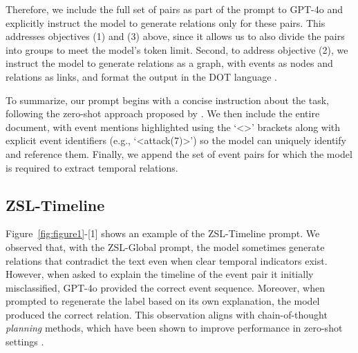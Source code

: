 Therefore, we include the full set of pairs as part of the prompt to GPT-4o and explicitly instruct the model to generate relations only for these pairs. This addresses objectives (1) and (3) above, since it allows us to also divide the pairs into groups to meet the model's token limit. 
Second, to address objective (2), we instruct the model to generate relations as a graph, with events as nodes and relations as links, and format the output in the DOT language \cite{Gansner2006DrawingGW}. 

To summarize, our prompt begins with a concise instruction about the task, following the zero-shot approach proposed by \citet{yuan-etal-2023-zero}. We then include the entire document, with event mentions highlighted using the `<>' brackets along with explicit event identifiers (e.g., `<attack(7)>') so the model can uniquely identify and reference them. Finally, we append the set of event pairs for which the model is required to extract temporal relations.




\subsection{ZSL-Timeline}
\label{section:model:timeline}
Figure~\ref{fig:figure1}-[1] shows an example of the ZSL-Timeline prompt.
We observed that, with the ZSL-Global prompt, the model sometimes generate relations that contradict the text even when clear temporal indicators exist. However, when asked to explain the timeline of the event pair it initially misclassified, GPT-4o  provided the correct event sequence. Moreover, when prompted to regenerate the label based on its own explanation, the model produced the correct relation. This observation aligns with chain-of-thought \textit{planning} methods, which have been shown to improve performance in zero-shot settings \cite{wang-etal-2023-plan, sun-etal-2024-pearl}.

